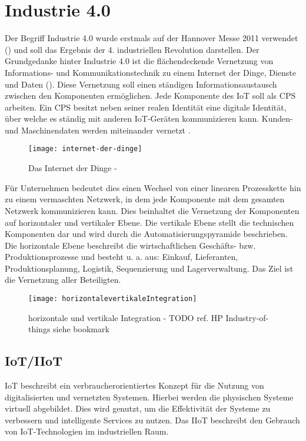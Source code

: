 \section{Industrie 4.0}
Der Begriff Industrie 4.0 wurde erstmals auf der Hannover Messe 2011 verwendet (\cite{drath2014}) und soll das Ergebnis der 4. industriellen Revolution darstellen. Der Grundgedanke hinter Industrie 4.0 ist die flächendeckende Vernetzung von Informations- und Kommunikationstechnik zu einem Internet der Dinge, Dienste und Daten (\cite{Spath2013}). Diese Vernetzung soll einen ständigen Informationsaustausch zwischen den Komponenten ermöglichen. Jede Komponente des \ac{IoT} soll als \ac{CPS} arbeiten. Ein \ac{CPS} besitzt neben seiner realen Identität eine digitale Identität, über welche es ständig mit anderen \ac{IoT}-Geräten kommunizieren kann. Kunden- und Maschinendaten werden miteinander vernetzt \cite{rami2016}.

\begin{figure}[h]
  \centering
  \texttt{[image: internet-der-dinge]}
  \caption{Das Internet der Dinge - \cite{rami2016}}
  \label{Kap2:Das Internet der Dinge}
\end{figure}

\clearpage

Für Unternehmen bedeutet dies einen Wechsel von einer linearen Prozesskette hin zu einem vermaschten Netzwerk, in dem jede Komponente mit dem gesamten Netzwerk kommunizieren kann. Dies beinhaltet die Vernetzung der Komponenten auf horizontaler und vertikaler Ebene. Die vertikale Ebene stellt die technischen Komponenten dar und wird durch die Automatisierungspyramide beschrieben. Die horizontale Ebene beschreibt die wirtschaftlichen Geschäfts- bzw. Produktionsprozesse und besteht u. a. aus: Einkauf, Lieferanten, Produktionsplanung, Logistik, Sequenzierung und Lagerverwaltung. Das Ziel ist die Vernetzung aller Beteiligten.

\begin{figure}[h]
  \centering
  \texttt{[image: horizontalevertikaleIntegration]}
  \caption{horizontale und vertikale Integration - TODO ref. HP Industry-of-things siehe bookmark}
  \label{Kap2:horizontale und vertikale Integration}
\end{figure}

\clearpage

\subsection{\ac{IoT}/\ac{IIoT}}
\ac{IoT} beschreibt ein verbraucherorientiertes Konzept für die Nutzung von digitalisierten und vernetzten Systemen. Hierbei werden die physischen Systeme virtuell abgebildet. Dies wird genutzt, um die Effektivität der Systeme zu verbessern und intelligente Services zu nutzen. Das \ac{IIoT} beschreibt den Gebrauch von \ac{IoT}-Technologien im industriellen Raum.

